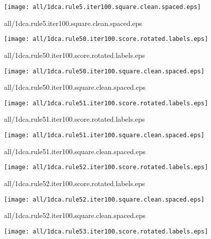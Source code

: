 \documentclass{article}
\begin{document}
\begin{center}
\begin{minipage}{\textwidth}
\texttt{[image: all/1dca.rule5.iter100.square.clean.spaced.eps]}
\end{minipage}
\end{center}
{\footnotesize all/1dca.rule5.iter100.square.clean.spaced.eps}
\begin{center}
\begin{minipage}{\textwidth}
\texttt{[image: all/1dca.rule50.iter100.score.rotated.labels.eps]}
\end{minipage}
\end{center}
{\footnotesize all/1dca.rule50.iter100.score.rotated.labels.eps}
\begin{center}
\begin{minipage}{\textwidth}
\texttt{[image: all/1dca.rule50.iter100.square.clean.spaced.eps]}
\end{minipage}
\end{center}
{\footnotesize all/1dca.rule50.iter100.square.clean.spaced.eps}
\begin{center}
\begin{minipage}{\textwidth}
\texttt{[image: all/1dca.rule51.iter100.score.rotated.labels.eps]}
\end{minipage}
\end{center}
{\footnotesize all/1dca.rule51.iter100.score.rotated.labels.eps}
\begin{center}
\begin{minipage}{\textwidth}
\texttt{[image: all/1dca.rule51.iter100.square.clean.spaced.eps]}
\end{minipage}
\end{center}
{\footnotesize all/1dca.rule51.iter100.square.clean.spaced.eps}
\begin{center}
\begin{minipage}{\textwidth}
\texttt{[image: all/1dca.rule52.iter100.score.rotated.labels.eps]}
\end{minipage}
\end{center}
{\footnotesize all/1dca.rule52.iter100.score.rotated.labels.eps}
\begin{center}
\begin{minipage}{\textwidth}
\texttt{[image: all/1dca.rule52.iter100.square.clean.spaced.eps]}
\end{minipage}
\end{center}
{\footnotesize all/1dca.rule52.iter100.square.clean.spaced.eps}
\begin{center}
\begin{minipage}{\textwidth}
\texttt{[image: all/1dca.rule53.iter100.score.rotated.labels.eps]}
\end{minipage}
\end{center}
\end{document}
